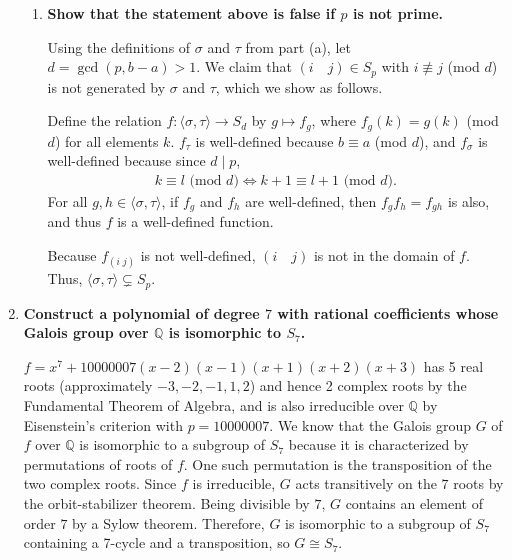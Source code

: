\documentclass[12pt]{article}
\newcommand{\QQ}{\mathbb{Q}}
\begin{document}
\begin{enumerate}
\begin{enumerate}
        \item
            \boldmath\textbf{Show that the statement above is false if $p$ is not prime. 
            }\unboldmath \par
            Using the definitions of $\sigma$ and $\tau$ from part (a), let $d = \gcd(p, b - a) > 1$. We claim that $(i \quad j) \in S_p$ with $i \not\equiv j$ (mod $d$) is not generated by $\sigma$ and $\tau$, which we show as follows. \par
            Define the relation $f : \langle \sigma, \tau \rangle \to S_d$ by $g \mapsto f_g$, where $f_g(k) = g(k)$ (mod $d$) for all elements $k$. $f_\tau$ is well-defined because $b \equiv a$ (mod $d$), and $f_\sigma$ is well-defined because since $d \mid p$,
            \begin{align*}
                k \equiv l \text{ (mod $d$)} \Leftrightarrow k + 1 \equiv l + 1 \text{ (mod $d$)}.
            \end{align*}
            For all $g, h \in \langle \sigma, \tau \rangle$, if $f_g$ and $f_h$ are well-defined, then $f_g f_h = f_{gh}$ is also, and thus $f$ is a well-defined function. \par
            Because $f_{(i \; j)}$ is not well-defined, $(i \quad j)$ is not in the domain of $f$. Thus, $\langle \sigma, \tau \rangle \subsetneq S_p$.
    \end{enumerate}

    \item
        \boldmath\textbf{Construct a polynomial of degree $7$ with rational coefficients whose Galois group over $\QQ$ is isomorphic to $S_7$.
        }\unboldmath \par
        $f = x^7 + 10000007(x - 2)(x - 1)(x + 1)(x + 2)(x + 3)$ has 5 real roots (approximately $-3, -2, -1, 1, 2$) and hence 2 complex roots by the Fundamental Theorem of Algebra, and is also irreducible over $\mathbb{Q}$ by Eisenstein's criterion with $p = 10000007$. We know that the Galois group $G$ of $f$ over $\mathbb{Q}$ is isomorphic to a subgroup of $S_7$ because it is characterized by permutations of roots of $f$. One such permutation is the transposition of the two complex roots. Since $f$ is irreducible, $G$ acts transitively on the $7$ roots by the orbit-stabilizer theorem. Being divisible by $7$, $G$ contains an element of order $7$ by a Sylow theorem. Therefore, $G$ is isomorphic to a subgroup of $S_7$ containing a 7-cycle and a transposition, so $G \cong S_7$.
\end{enumerate}
\end{document}
